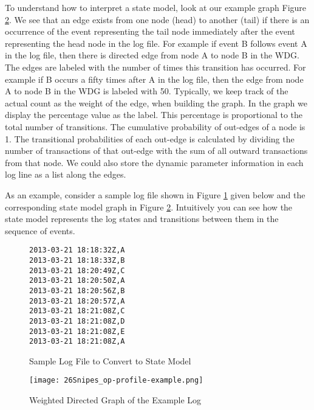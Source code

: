 To understand how to interpret a state model, look at our example graph Figure \ref{op-profile-example}.  We see that an edge exists from one node (head) to another (tail) if there is an occurrence of the event representing the tail node immediately after the event representing the head node in the  log file. For example if event B follows event A in the log file, then there is directed edge from node A to node B in the WDG. The edges are labeled with the number of times this transition has occurred.  For example if B occurs a fifty times after A in the log file, then the edge from node A to node B in the WDG is labeled with 50. Typically, we keep track of the actual count as the weight of the edge, when building the graph. In the graph we display the percentage value as the label. This percentage is proportional to the total number of transitions.  The cumulative probability of out-edges of a node is 1. The transitional probabilities of each out-edge is calculated by dividing the number of transactions of that out-edge with the sum of all outward transactions from that node. We could also store the dynamic parameter information in each log line as a list along the edges. 

As an example, consider a sample log file shown in Figure \ref{samplelogfile} given below and the corresponding state model graph in Figure \ref{op-profile-example}. Intuitively you can see how the state model represents the log states and transitions between them in the sequence of events.  

\begin{figure}
\hrulefill
\begin{verbatim}
2013-03-21 18:18:32Z,A
2013-03-21 18:18:33Z,B
2013-03-21 18:20:49Z,C
2013-03-21 18:20:50Z,A
2013-03-21 18:20:56Z,B
2013-03-21 18:20:57Z,A
2013-03-21 18:21:08Z,C
2013-03-21 18:21:08Z,D
2013-03-21 18:21:08Z,E
2013-03-21 18:21:08Z,A
\end{verbatim}
\hrulefill
\caption{Sample Log File to Convert to State Model}\label{samplelogfile}
\end{figure}

\begin{figure}[ht]
  \centering
  \texttt{[image: 26Snipes\_op-profile-example.png]}
  \caption{Weighted Directed Graph of the Example Log}\label{op-profile-example}
\end{figure}






 
